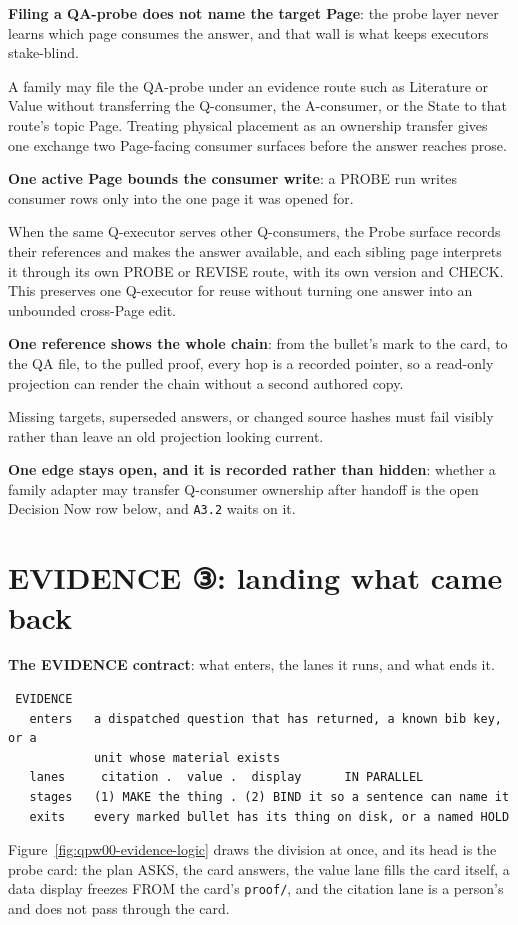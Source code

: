 \textbf{Filing a QA-probe does not name the target Page}: the probe layer never learns which page consumes the answer, and that wall is what keeps executors stake-blind.

A family may file the QA-probe under an evidence route such as Literature or Value without transferring the Q-consumer, the A-consumer, or the State to that route's topic Page. Treating physical placement as an ownership transfer gives one exchange two Page-facing consumer surfaces before the answer reaches prose.

\textbf{One active Page bounds the consumer write}: a PROBE run writes consumer rows only into the one page it was opened for.

When the same Q-executor serves other Q-consumers, the Probe surface records their references and makes the answer available, and each sibling page interprets it through its own PROBE or REVISE route, with its own version and CHECK. This preserves one Q-executor for reuse without turning one answer into an unbounded cross-Page edit.

\textbf{One reference shows the whole chain}: from the bullet's mark to the card, to the QA file, to the pulled proof, every hop is a recorded pointer, so a read-only projection can render the chain without a second authored copy.

Missing targets, superseded answers, or changed source hashes must fail visibly rather than leave an old projection looking current.

\textbf{One edge stays open, and it is recorded rather than hidden}: whether a family adapter may transfer Q-consumer ownership after handoff is the open Decision Now row below, and \texttt{A3.2} waits on it.


\section{EVIDENCE ③: landing what came back}
\textbf{The EVIDENCE contract}: what enters, the lanes it runs, and what ends it.

\begin{verbatim}
 EVIDENCE
   enters   a dispatched question that has returned, a known bib key, or a
            unit whose material exists
   lanes     citation .  value .  display      IN PARALLEL
   stages   (1) MAKE the thing . (2) BIND it so a sentence can name it
   exits    every marked bullet has its thing on disk, or a named HOLD
\end{verbatim}
Figure~\ref{fig:qpw00-evidence-logic} draws the division at once, and its head is the probe card: the plan ASKS, the card answers, the value lane fills the card itself, a data display freezes FROM the card's \texttt{proof/}, and the citation lane is a person's and does not pass through the card.

